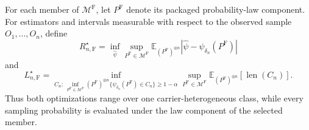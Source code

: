 For each member of \(\mathcal M^{\mathrm F}\), let \(P^{\mathrm F}\) denote its packaged probability-law component. For estimators and intervals measurable with respect to the observed sample \(O_1,\ldots,O_n\), define
\[
 R_{n,\mathrm F}^\star=\inf_{\widehat\psi}\sup_{P^{\mathrm F}\in\mathcal M^{\mathrm F}}
 \mathbb E_{(P^{\mathrm F})^{\otimes n}}|\widehat\psi-\psi_{\delta_n}(P^{\mathrm F})|
\]
and
\[
 L_{n,\mathrm F}^\star=
 \inf_{C_n:\,\inf_{P^{\mathrm F}\in\mathcal M^{\mathrm F}}
 (P^{\mathrm F})^{\otimes n}\{\psi_{\delta_n}(P^{\mathrm F})\in C_n\}\geq1-\alpha}
 \sup_{P^{\mathrm F}\in\mathcal M^{\mathrm F}}
 \mathbb E_{(P^{\mathrm F})^{\otimes n}}[\operatorname{len}(C_n)].
\]
Thus both optimizations range over one carrier-heterogeneous class, while every sampling probability is evaluated under the law component of the selected member.